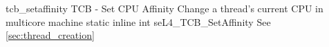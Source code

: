 %
%
%
%

\apidoc
{tcb_setaffinity}
{TCB - Set CPU Affinity}
{Change a thread's current CPU in multicore machine}
{static inline int seL4\_TCB\_SetAffinity }
{
}
{\errorenumdesc}
{See \autoref{sec:thread_creation}}
